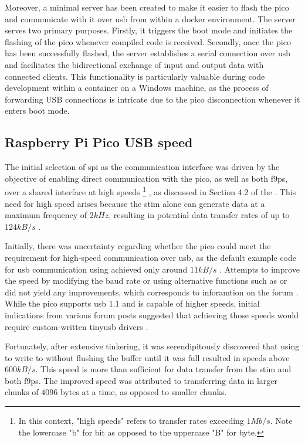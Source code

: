 Moreover, a minimal \py server has been created to make it easier to flash the \gls{pico} and communicate with it over \gls{usb} from within a \gls{docker} environment.
The server serves two primary purposes.
Firstly, it triggers the boot mode and initiates the flashing of the \gls{pico} whenever compiled code is received.
Secondly, once the \gls{pico} has been successfully flashed, the server establishes a serial connection over \gls{usb} and facilitates the bidirectional exchange of input and output data with connected clients.
This functionality is particularly valuable during code development within a container on a Windows machine, as the process of forwarding USB connections is intricate due to the \gls{pico} disconnection whenever it enters boot mode.


\subsection{Raspberry Pi Pico USB speed}

The initial selection of \gls{spi} as the communication interface was driven by the objective of enabling direct communication with the \gls{pico}, as well as both \glspl{f9p}, over a shared interface at high speeds
\footnote{In this context, "high speeds" refers to transfer rates exceeding $1Mb/s$.
    Note the lowercase "b" for bit as opposed to the uppercase "B" for byte.}
, as discussed in Section 4.2 of the \preproject.
This need for high speed arises because the \gls{stim} alone can generate data at a maximum frequency of $2kHz$, resulting in potential data transfer rates of up to $124kB/s$ \cite[34]{safranSTIM300Datasheet}.

Initially, there was uncertainty regarding whether the \gls{pico} could meet the requirement for high-speed communication over \gls{usb}, as the default example code for \gls{usb} communication using  achieved only around $11kB/s$ \cite[usb/device]{RaspberryPiPico2023}.
Attempts to improve the speed by modifying the baud rate or using alternative functions such as  or  did not yield any improvements, which corresponds to inforamtion on the forum \cite{hippyAnswerSettingUsb2021}.
While the \gls{pico} supports \gls{usb} 1.1 and is capable of higher speeds, initial indications from various forum posts suggested that achieving those speeds would require custom-written \gls{tinyusb} drivers \cite[usb/device]{RaspberryPiPico2023}.

Fortunately, after extensive tinkering, it was serendipitously discovered that using  to write to  without flushing the buffer until it was full resulted in speeds above $600kB/s$.
This speed is more than sufficient for data transfer from the \gls{stim} and both \glspl{f9p}.
The improved speed was attributed to transferring data in larger chunks of $4096$ bytes at a time, as opposed to smaller chunks.

